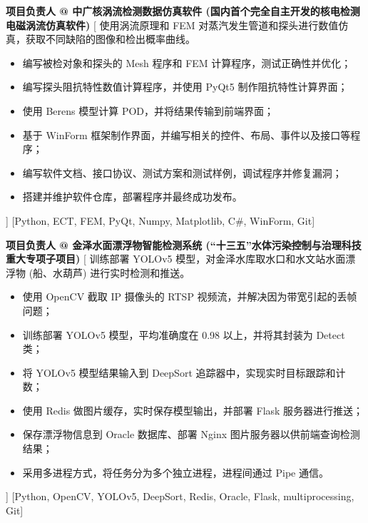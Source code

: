 \begin{experiences}
    {\textbf{项目负责人 @ 中广核涡流检测数据仿真软件 (国内首个完全自主开发的核电检测电磁涡流仿真软件)}}%
    [
    使用涡流原理和 FEM 对蒸汽发生管道和探头进行数值仿真，获取不同缺陷的图像和检出概率曲线。
        \begin{itemize}
            \item {编写被检对象和探头的 Mesh 程序和 FEM 计算程序，测试正确性并优化；}
            \item {编写探头阻抗特性数值计算程序，并使用 PyQt5 制作阻抗特性计算界面；}
            \item {使用 Berens 模型计算 POD，并将结果传输到前端界面；}
            \item {基于 WinForm 框架制作界面，并编写相关的控件、布局、事件以及接口等程序；}
            \item {编写软件文档、接口协议、测试方案和测试样例，调试程序并修复漏洞；}
            \item {搭建并维护软件仓库，部署程序并最终成功发布。}
        \end{itemize}
    ]
    [Python, ECT, FEM, PyQt, Numpy, Matplotlib, C\#, WinForm, Git]
    \separator{0.5ex}

    {\textbf{项目负责人 @ 金泽水面漂浮物智能检测系统 (``十三五''水体污染控制与治理科技重大专项子项目)}}%
    [
    训练部署 YOLOv5 模型，对金泽水库取水口和水文站水面漂浮物 (船、水葫芦) 进行实时检测和推送。
        \begin{itemize}
            \item {使用 OpenCV 截取 IP 摄像头的 RTSP 视频流，并解决因为带宽引起的丢帧问题；}
            \item {训练部署 YOLOv5 模型，平均准确度在 0.98 以上，并将其封装为 Detect 类；}
            \item {将 YOLOv5 模型结果输入到 DeepSort 追踪器中，实现实时目标跟踪和计数；}
            \item {使用 Redis 做图片缓存，实时保存模型输出，并部署 Flask 服务器进行推送；}
            \item {保存漂浮物信息到 Oracle 数据库、部署 Nginx 图片服务器以供前端查询检测结果；}
            \item {采用多进程方式，将任务分为多个独立进程，进程间通过 Pipe 通信。}
        \end{itemize}]
    [Python, OpenCV, YOLOv5, DeepSort, Redis, Oracle, Flask, multiprocessing, Git]
\end{experiences}